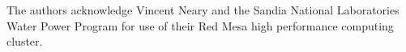 \documentclass[aip,graphicx]{revtex4-1}
\begin{document}
\begin{acknowledgments}
The authors acknowledge Vincent Neary and the Sandia National Laboratories Water
Power Program for use of their Red Mesa high performance computing cluster.
\end{acknowledgments}


\end{document}
